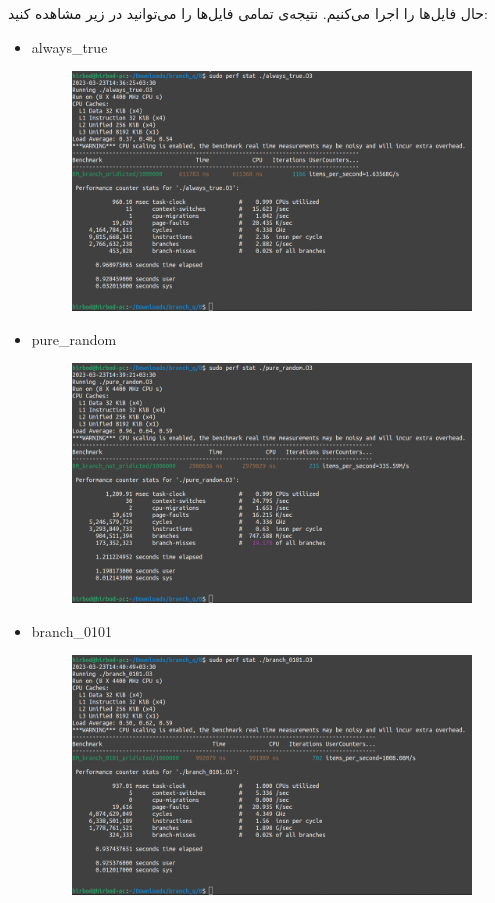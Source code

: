 \begin{enumerate}
    حال فایل‌ها را اجرا می‌کنیم. نتیجه‌ی  تمامی فایل‌ها را می‌توانید در زیر مشاهده کنید:
    \begin{latin}
    \begin{itemize}
        \item always\_true
        \begin{figure}[H]
            \centerline{\includegraphics[scale=0.35]{pics/5/B/always_true.png}}
        \end{figure}
        \item pure\_random
        \begin{figure}[H]
            \centerline{\includegraphics[scale=0.35]{pics/5/B/pure_random.png}}
        \end{figure}
        \item branch\_0101
        \begin{figure}[H]
            \centerline{\includegraphics[scale=0.35]{pics/5/B/branch_0101.png}}

\end{figure}
\end{itemize}
\end{latin}
\end{enumerate}
